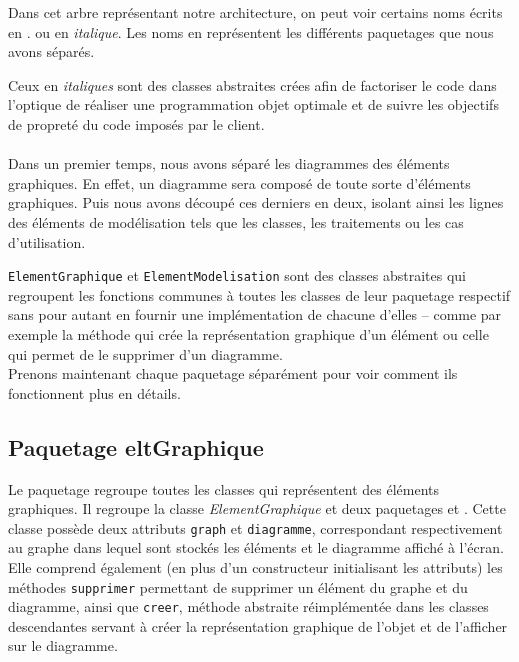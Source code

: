 \documentclass[12pt,a4paper,oneside]{book}
\begin{document}
		Dans cet arbre représentant notre architecture, on peut voir certains noms écrits en . 
		ou en \textit{italique}. 
		Les noms en  représentent les différents paquetages que nous avons séparés.
		
		Ceux en \textit{italiques} sont des classes abstraites crées afin de factoriser le code dans l'optique de réaliser une programmation objet optimale 
		et de suivre les objectifs de propreté du code imposés par le client.\vspace{2px}
	\paragraph{}	
		Dans un premier temps, nous avons séparé les diagrammes des éléments graphiques. En effet, un diagramme sera composé de
		toute sorte d'éléments graphiques. Puis nous avons découpé ces derniers en deux, isolant ainsi les lignes des éléments
		de modélisation tels que les classes, les traitements ou les cas d'utilisation.\vspace{2px}
		
		\texttt{ElementGraphique} et \texttt{ElementModelisation} sont des classes abstraites qui regroupent les fonctions communes
		à toutes les classes de leur paquetage respectif sans pour autant en fournir une implémentation de chacune d'elles -- comme par exemple la méthode qui crée la
		représentation graphique d'un élément ou celle qui permet de le supprimer d'un diagramme.\\ 
	Prenons maintenant chaque paquetage séparément pour voir comment ils fonctionnent plus en détails.
	\subsection{Paquetage eltGraphique}
	Le paquetage  regroupe toutes les classes qui représentent des éléments graphiques. Il regroupe la classe 
	\textit{ElementGraphique} et deux paquetages  et . Cette classe possède deux attributs 
	\texttt{graph} et \texttt{diagramme}, correspondant respectivement au graphe dans lequel sont stockés les éléments 
	et le diagramme affiché à l'écran. Elle comprend également (en plus d'un constructeur initialisant les attributs) 
	les méthodes \texttt{supprimer} permettant de supprimer un élément du graphe et du diagramme, ainsi que \texttt{creer}, 
	méthode abstraite réimplémentée dans les classes descendantes servant à créer la représentation graphique de l'objet 
	et de l'afficher sur le diagramme.
\end{document}
